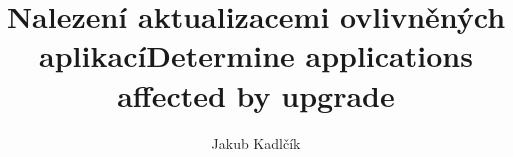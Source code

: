 \documentclass[
  field=inf,
  biblatex,
  glossaries,
  index
]{kidiplom}
\title{Nalezení aktualizacemi ovlivněných aplikací}
\title[english]{Determine applications affected by upgrade}
\subtitle{}
\subtitle[english]{}
\author{Jakub Kadlčík}
\begin{document}
\maketitle



\newcommand{\BibLaTeX}{\textsc{Bib}\LaTeX}



\end{document}
